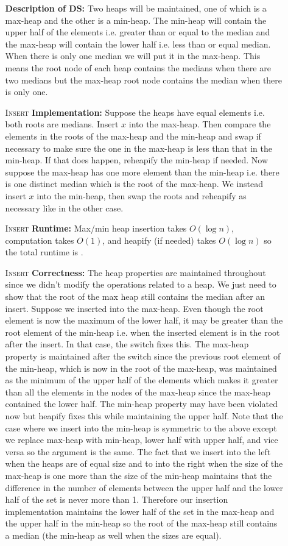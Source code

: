 \documentclass[12pt,twoside]{article}
\begin{document}
\begin{problems}
\begin{itemize}
\item[]
\begin{itemize}
\item[\textbf{Description of DS: }] Two heaps will be maintained, one of which is a max-heap and the other is a min-heap. The min-heap will contain the upper half of the elements i.e. greater than or equal to the median and the max-heap will contain the lower half i.e. less than or equal median. When there is only one median we will put it in the max-heap. This means the root node of each heap contains the medians when there are two medians but the max-heap root node contains the median when there is only one.
\item [\textsc{Insert}\textbf{ Implementation: }] Suppose the heaps have equal elements i.e. both roots are medians. Insert $x$ into the max-heap. Then compare the elements in the roots of the max-heap and the min-heap and swap if necessary to make sure the one in the max-heap is less than that in the min-heap. If that does happen, reheapify the min-heap if needed. Now suppose the max-heap has one more element than the min-heap i.e. there is one distinct median which is the root of the max-heap. We instead insert $x$ into the min-heap, then swap the roots and reheapify as necessary like in the other case. 
\item [\textsc{Insert}\textbf{ Runtime: }] Max/min heap insertion takes $O(\log n)$, computation takes $O(1)$, and heapify (if needed) takes $O(\log n)$ so the total runtime is . 
\item [\textsc{Insert}\textbf{ Correctness: }] The heap properties are maintained throughout since we didn't modify the operations related to a heap. We just need to show that the root of the max heap still contains the median after an insert. Suppose we inserted into the max-heap. Even though the root element is now the maximum of the lower half, it may be greater than the root element of the min-heap i.e. when the inserted element is in the root after the insert. In that case, the switch fixes this. The max-heap property is maintained after the switch since the previous root element of the min-heap, which is now in the root of the max-heap, was maintained as the minimum of the upper half of the elements which makes it greater than all the elements in the nodes of the max-heap since the max-heap contained the lower half. The min-heap property may have been violated now but heapify fixes this while maintaining the upper half. Note that the case where we insert into the min-heap is symmetric to the above except we replace max-heap with min-heap, lower half with upper half, and vice versa so the argument is the same. The fact that we insert into the left when the heaps are of equal size and to into the right when the size of the max-heap is one more than the size of the min-heap maintains that the difference in the number of elements between the upper half and the lower half of the set is never more than 1. Therefore our insertion implementation maintains the lower half of the set in the max-heap and the upper half in the min-heap so the root of the max-heap still contains a median (the min-heap as well when the sizes are equal).

\end{itemize}
\end{itemize}
\end{problems}
\end{document}
